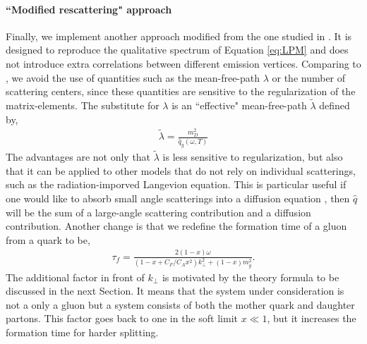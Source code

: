 \documentclass[aps, prc, reprint, amsmath, groupedaddress, nofootinbib]{revtex4-1}
\begin{document}
\paragraph*{``Modified rescattering" approach} Finally, we implement another approach modified from the one studied in \cite{Zapp:2011ya,Park:thesis,Park:2016jap}.
It is designed to reproduce the qualitative spectrum of Equation \ref{eq:LPM} and does not introduce extra correlations between different emission vertices. 
Comparing to \cite{Zapp:2011ya}, we avoid the use of quantities such as the mean-free-path $\lambda$ or the number of scattering centers, since these quantities are sensitive to the regularization of the matrix-elements. 
The substitute for $\lambda$ is an ``effective" mean-free-path $\tilde{\lambda}$ defined by,
\begin{eqnarray}\label{eq:effmpf}
\tilde{\lambda} = \frac{m_D^2}{\hat{q}_g(\omega, T)}
\end{eqnarray}
The advantages are not only that $\tilde{\lambda}$ is less sensitive to regularization, but also that it can be applied to other models that do not rely on individual scatterings, such as the radiation-imporved Langevion equation.
This is particular useful if one would like to absorb small angle scatterings into a diffusion equation \cite{Ghiglieri:2015ala}, then $\hat{q}$ will be the sum of a large-angle scattering contribution and a diffusion contribution.
Another change is that we redefine the formation time of a gluon from a quark to be,
\begin{eqnarray}\label{eq:formation-time-def}
\tau_f = \frac{2(1-x)\omega}{\left(1-x+C_F/C_A x^2\right)k_\perp^2 + (1-x)m_g^2}.
\end{eqnarray}
The additional factor in front of $k_\perp$ is motivated by the theory formula to be discussed in the next Section.
It means that the system under consideration is not a only a gluon but a system consists of both the mother quark and daughter partons. 
This factor goes back to one in the soft limit $x\ll 1$, but it increases the formation time for harder splitting. 
\end{document}
